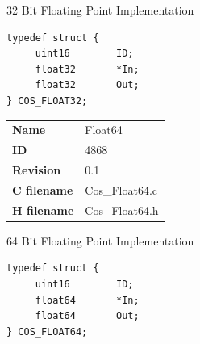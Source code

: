 32 Bit Floating Point Implementation

\begin{lstlisting}
typedef struct {
     uint16        ID;
     float32       *In;
     float32       Out;
} COS_FLOAT32;
\end{lstlisting}

\ifdefined \AddTestReports
{}
\fi
{}
\nopagebreak[0]
\begin{tabular}{l l}
\textbf{Name} & Float64 \tabularnewline
\textbf{ID} & 4868 \tabularnewline
\textbf{Revision} & 0.1 \tabularnewline
\textbf{C filename} & Cos\_Float64.c \tabularnewline
\textbf{H filename} & Cos\_Float64.h \tabularnewline
\end{tabular}
\vspace{1ex}

64 Bit Floating Point Implementation

\begin{lstlisting}
typedef struct {
     uint16        ID;
     float64       *In;
     float64       Out;
} COS_FLOAT64;
\end{lstlisting}

\ifdefined \AddTestReports
{}
\fi
